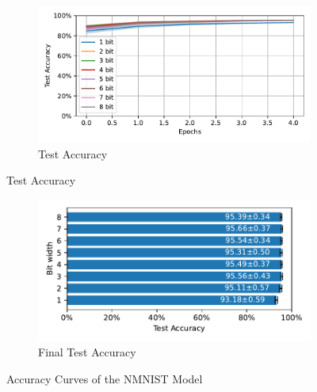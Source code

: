         \begin{figure}[H]
            \centering
            \ContinuedFloat
            \begin{subfigure}[H]{\textwidth}
                \centering
                \includegraphics[width=\textwidth]{../standard/NMNIST/plots/nmnist_test_acc.pdf}
                \caption{Test Accuracy}
            \end{subfigure}
        \end{figure}
        \begin{figure}[H]
            \centering
            \ContinuedFloat
            \begin{subfigure}[H]{\textwidth}
                \centering
                \includegraphics[width=\textwidth]{../standard/NMNIST/plots/nmnist_final_acc_horizontal.pdf}
                \caption{Final Test Accuracy}
            \end{subfigure}
            \caption{Accuracy Curves of the NMNIST Model}
        \end{figure}

